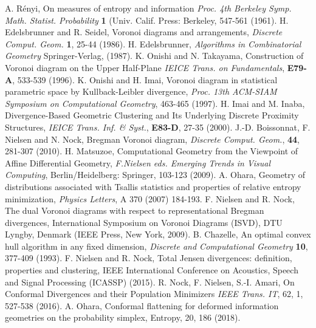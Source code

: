 \documentclass{llncs}
\begin{document}
\begin{thebibliography}{5}
 A. R\'enyi,
		On measures of entropy and information 
		{\it Proc. 4th Berkeley Symp. Math. Statist. Probability}
		{\bf 1} (Univ. Calif. Press: Berkeley, 547-561 (1961).
	H. Edelsbrunner and R. Seidel,
		Voronoi diagrams and arrangements,
		{\it Discrete Comput. Geom.} {\bf 1}, 25-44 (1986).
	H. Edelsbrunner,
		{\it Algorithms in Combinatorial Geometry}
		Springer-Verlag, (1987).
	K. Onishi and N. Takayama,
		Construction of Voronoi diagram on the Upper Half-Plane
		{\it IEICE Trans. on Fundamentals}, {\bf E79-A}, 
		533-539 (1996).
	K. Onishi and H. Imai,
		Voronoi diagram in statistical parametric space by 
		Kullback-Leibler divergence,
		{\it Proc. 13th ACM-SIAM Symposium on Computational Geometry}, 
		 463-465 (1997).
	H. Imai and M. Inaba,
		Divergence-Based Geometric Clustering and Its Underlying 
		Discrete Proximity Structures,
		{\it IEICE Trans. Inf. \& Syst.}, {\bf E83-D}, 27-35 (2000).
	J.-D. Boissonnat, F. Nielsen and N. Nock,
		Bregman Voronoi diagram,
		{\it Discrete Comput. Geom.}, {\bf 44}, 281-307 (2010). 
 H. Matsuzoe,
		Computational Geometry from the Viewpoint of Affine 
		Differential Geometry,
		{\it F.Nielsen eds. Emerging Trends in Visual Computing}, 
		Berlin/Heidelberg: Springer, 103-123 (2009).
 A. Ohara,
		Geometry of distributions associated with Tsallis statistics
		and properties of relative entropy minimization,
		{\it Physics Letters}, A 370 (2007) 184-193.
	F. Nielsen and R. Nock,
		The dual Voronoi diagrams with respect to representational 
		Bregman divergences,
		International Symposium on Voronoi Diagrams (ISVD), 
		DTU Lyngby, Denmark (IEEE Press, New York, 2009).
 B. Chazelle, 
		An optimal convex hull algorithm in any fixed dimension,
		{\it Discrete and Computational Geometry} {\bf 10}, 377-409 
		(1993).
 F. Nielsen and R. Nock,
		Total Jensen divergences: definition, properties 
		and clustering, 
		IEEE International Conference on Acoustics, Speech and 
		Signal Processing (ICASSP) (2015).
 R. Nock, F. Nielsen, S.-I. Amari,
		On Conformal Divergences and their Population Minimizers
		{\em IEEE Trans. IT}, 62, 1, 527-538 (2016).
 A. Ohara,
		Conformal flattening for deformed information geometries on 
		the probability simplex,
		Entropy, 20, 186 (2018).
\end{thebibliography}
\end{document}
